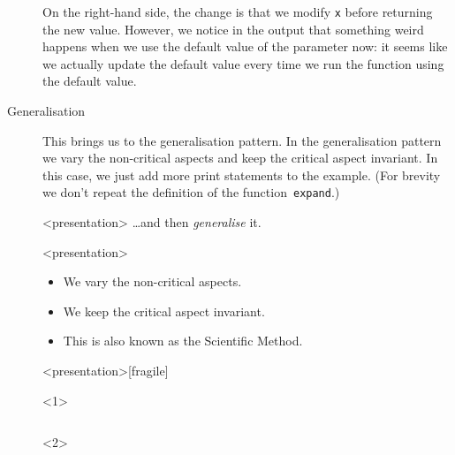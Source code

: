 \begin{description}
    On the right-hand side, the change is that we modify \texttt{x} 
    before returning the new value.
    However, we notice in the output that something weird happens when we use 
    the default value of the parameter now:
    it seems like we actually update the default value every time we run the 
    function using the default value.

  \item[Generalisation] This brings us to the generalisation pattern.
    In the generalisation pattern we vary the non-critical aspects and keep the 
    critical aspect invariant.
    In this case, we just add more print statements to the example.
    (For brevity we don't repeat the definition of the 
    function~\texttt{expand}.)

    \begin{frame}<presentation>
      \dots and then \emph{generalise} it.
    \end{frame}

    \begin{frame}<presentation>
      \begin{remark}[Generalisation]
        \begin{itemize}
          \item We vary the non-critical aspects.
          \item We keep the critical aspect invariant.
            \pause
          \item \alert<3>{This is also known as the Scientific Method.}
        \end{itemize}
      \end{remark}
    \end{frame}

    \begin{frame}<presentation>[fragile]
      \begin{example}[experiment2.py]
        \begin{onlyenv}<1>
          \inputminted[firstline=1,lastline=13]{python}{examples/experiment2.py}
        \end{onlyenv}
        \begin{onlyenv}<2>
          \inputminted[firstline=1,lastline=2]{python}{examples/experiment2.py}
          \inputminted[firstline=9,lastline=10]{python}{examples/experiment2.py}
          \inputminted[firstline=14]{python}{examples/experiment2.py}
        \end{onlyenv}
      \end{example}
    \end{frame}


\end{description}
